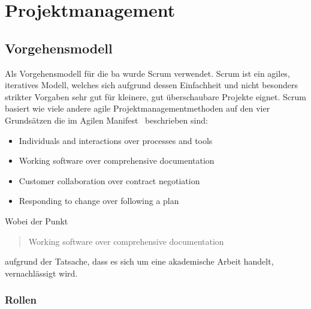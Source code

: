 \part{Projektmanagement}

\chapter{Vorgehensmodell}
Als Vorgehensmodell für die \acl{ba} wurde Scrum verwendet. Scrum ist ein agiles, iteratives Modell, welches sich aufgrund dessen Einfachheit und nicht besonders strikter Vorgaben sehr gut für kleinere, gut überschaubare Projekte eignet. Scrum basiert wie viele andere agile Projektmanagementmethoden auf den vier Grundsätzen die im Agilen Manifest~\cite{agilemanifesto} beschrieben sind:

\begin{itemize}
	\item Individuals and interactions over processes and tools
	\item Working software over comprehensive documentation
	\item Customer collaboration over contract negotiation
	\item Responding to change over following a plan
\end{itemize}

Wobei der Punkt \blockquote{Working software over comprehensive documentation} aufgrund der Tatsache, dass es sich um eine akademische Arbeit handelt, vernachlässigt wird.

\section{Rollen}

